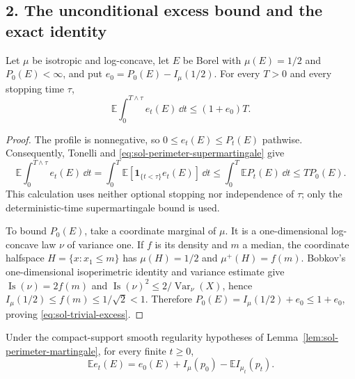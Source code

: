 \documentclass[../main.tex]{subfiles}
\begin{document}
\subsection*{2. The unconditional excess bound and the exact identity}

\begin{proposition}
\label{prop:sol-trivial-excess}
Let $\mu$ be isotropic and log-concave, let $E$ be Borel with
$\mu(E)=1/2$ and $P_0(E)<\infty$, and put $e_0=P_0(E)-I_\mu(1/2)$.  For every $T>0$ and every
stopping time $\tau$,
\begin{equation}
  \mathbb E\int_0^{T\wedge\tau}e_t(E)\,\dd t\leq(1+e_0)T.
  \label{eq:sol-trivial-excess}
\end{equation}
\end{proposition}

\begin{proof}
The profile is nonnegative, so $0\leq e_t(E)\leq P_t(E)$ pathwise.  Consequently, Tonelli and
\eqref{eq:sol-perimeter-supermartingale} give
\[
  \mathbb E\int_0^{T\wedge\tau}e_t(E)\,\dd t
  =\int_0^T\mathbb E[\mathbf 1_{\{t<\tau\}}e_t(E)]\,\dd t
  \leq\int_0^T\mathbb E P_t(E)\,\dd t
  \leq T P_0(E).
\]
This calculation uses neither optional stopping nor independence of $\tau$; only the
deterministic-time supermartingale bound is used.

To bound $P_0(E)$, take a coordinate marginal of $\mu$.  It is a one-dimensional log-concave
law $\nu$ of variance one.  If $f$ is its density and $m$ a median, the coordinate halfspace
$H=\{x:x_1\leq m\}$ has $\mu(H)=1/2$ and $\mu^+(H)=f(m)$.  Bobkov's
one-dimensional isoperimetric identity and variance estimate
\cite[Proposition~4.1 and (4.2)]{Bobkov1999LogConcave} give
$\operatorname{Is}(\nu)=2f(m)$ and
$\operatorname{Is}(\nu)^2\leq2/\operatorname{Var}_\nu(X)$, hence
$I_\mu(1/2)\leq f(m)\leq1/\sqrt2<1$.  Therefore
$P_0(E)=I_\mu(1/2)+e_0\leq1+e_0$, proving
\eqref{eq:sol-trivial-excess}.
\end{proof}

\begin{lemma}
\label{lem:sol-excess-identity}
Under the compact-support smooth regularity hypotheses of
Lemma~\ref{lem:sol-perimeter-martingale}, for every finite $t\geq0$,
\begin{equation}
  \mathbb E e_t(E)
  =e_0(E)+I_\mu(p_0)-\mathbb E I_{\mu_t}(p_t).
  \label{eq:sol-excess-identity}
\end{equation}
\end{lemma}
\end{document}
